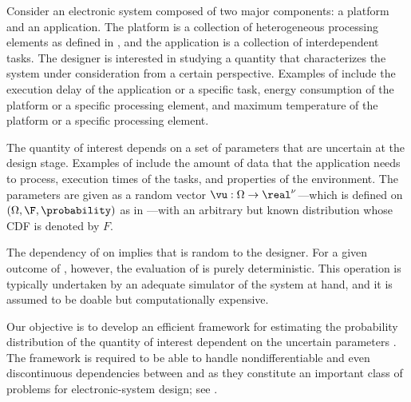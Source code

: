 Consider an electronic system composed of two major components: a platform and
an application. The platform is a collection of heterogeneous processing
elements as defined in , and the application is a collection
of interdependent tasks. The designer is interested in studying a quantity \g
that characterizes the system under consideration from a certain perspective.
Examples of \g include the execution delay of the application or a specific
task, energy consumption of the platform or a specific processing element, and
maximum temperature of the platform or a specific processing element.

The quantity of interest \g depends on a set of parameters \vu that are
uncertain at the design stage. Examples of \vu include the amount of data that
the application needs to process, execution times of the tasks, and properties
of the environment. The parameters \vu are given as a random vector $\vu: \Omega
\to \real^\nu$---which is defined on $(\Omega, \F, \probability)$ as in
---with an arbitrary but known distribution whose
\ac{CDF} is denoted by $F$.

The dependency of \g on \vu implies that \g is random to the designer. For a
given outcome of \vu, however, the evaluation of \g is purely deterministic.
This operation is typically undertaken by an adequate simulator of the system at
hand, and it is assumed to be doable but computationally expensive.

Our objective is to develop an efficient framework for estimating the
probability distribution of the quantity of interest \g dependent on the
uncertain parameters \vu. The framework is required to be able to handle
nondifferentiable and even discontinuous dependencies between \g and \vu as they
constitute an important class of problems for electronic-system design; see
.
